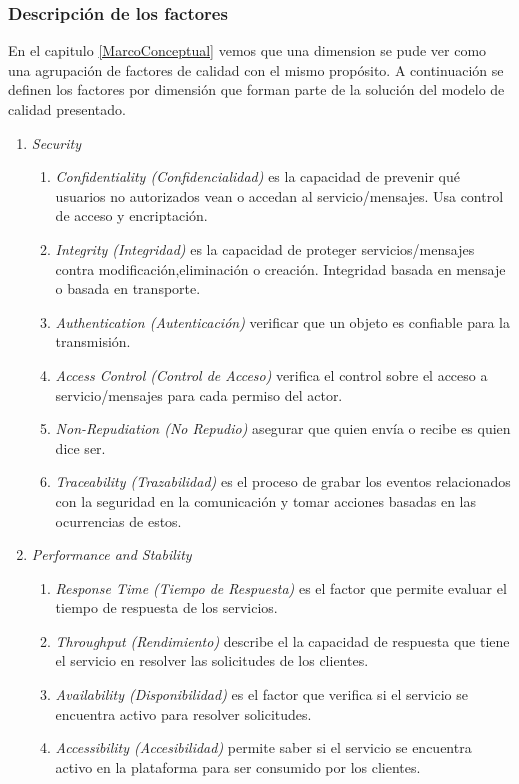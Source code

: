 \subsubsection{Descripción de los factores}
En el capitulo \ref{MarcoConceptual} vemos que una dimension se pude ver como una agrupación de factores de calidad con el mismo propósito. A continuación se definen los factores por dimensión que forman parte de la solución del modelo de calidad presentado.
\begin{enumerate}
\item \emph{Security}
	\begin{enumerate}
		\item \emph{Confidentiality (Confidencialidad)} es la capacidad de prevenir qué usuarios no autorizados vean o accedan al servicio/mensajes. Usa control de acceso y encriptación.
		\item \emph{Integrity (Integridad)}  es la capacidad de proteger servicios/mensajes contra modificación,eliminación o creación. Integridad basada en mensaje o basada en transporte.
		\item \emph{Authentication (Autenticación)} verificar que un objeto es confiable para la transmisión.
		\item \emph{Access Control (Control de Acceso)} verifica el control sobre el acceso a servicio/mensajes para cada permiso del actor.
		\item \emph{Non-Repudiation (No Repudio)} asegurar que quien envía o recibe es quien dice ser.
		\item \emph{Traceability (Trazabilidad)} es el proceso de grabar los eventos relacionados con la seguridad en la comunicación y tomar acciones basadas en las ocurrencias de estos.
	\end{enumerate}
\item \emph{Performance and Stability}
	\begin{enumerate}
	\item \emph{Response Time (Tiempo de Respuesta)} es el factor que permite evaluar el tiempo de respuesta de los servicios.
	\item \emph{Throughput (Rendimiento)} describe el la capacidad de respuesta que tiene el servicio en resolver las solicitudes de los clientes.
	\item \emph{Availability (Disponibilidad)} es el factor que verifica si el servicio se encuentra activo para resolver solicitudes.
	\item \emph{Accessibility (Accesibilidad)} permite saber si el servicio se encuentra activo en la plataforma para ser consumido por los clientes.

\end{enumerate}
\end{enumerate}
